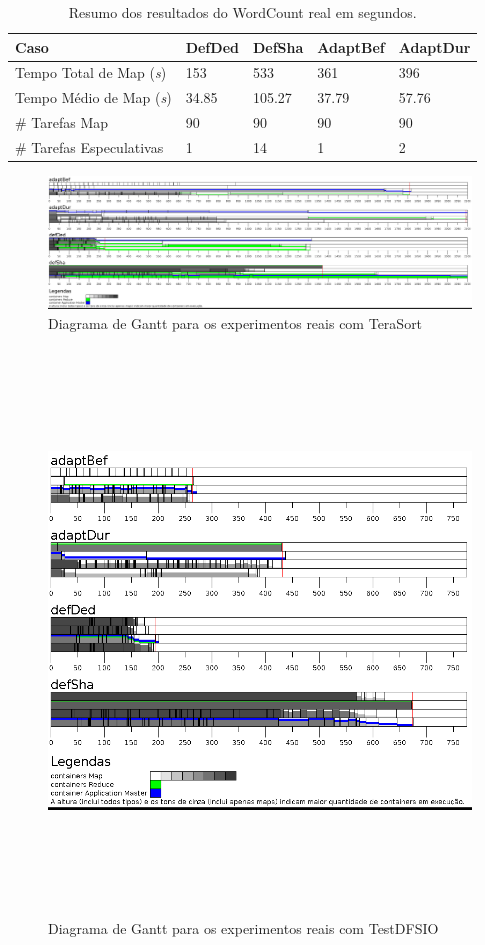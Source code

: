 \begin{table}[!ht]
	\caption{Resumo dos resultados do WordCount real em segundos.} \label{tab:exp2WC}
	\begin{tabular*}{\hsize}{lllll}
		\textbf{Caso} & \textbf{DefDed} & \textbf{DefSha} & \textbf{AdaptBef} & \textbf{AdaptDur}\\
		\hline
		Tempo Total de Map ({\it{s}}) & 153 & 533 & 361 & 396 \\
		Tempo Médio de Map ({\it{s}}) & 34.85 & 105.27 & 37.79 & 57.76 \\
		\# Tarefas Map & 90 & 90 & 90 & 90 \\
		\# Tarefas Especulativas & 1 & 14 & 1 & 2 \\
	\end{tabular*}
\end{table}

\begin{figure}[!ht]
	\centering
	\includegraphics[width=1\textwidth]{figuras/TS-real.png}
	\caption{Diagrama de Gantt para os experimentos reais com TeraSort}
	\label{fig:exp2TS}
\end{figure}

\begin{figure}[!ht]
	\centering
	\includegraphics[height=15cm]{figuras/DFS-real.png}
	\caption{Diagrama de Gantt para os experimentos reais com TestDFSIO}
	\label{fig:exp2IO}
\end{figure}

